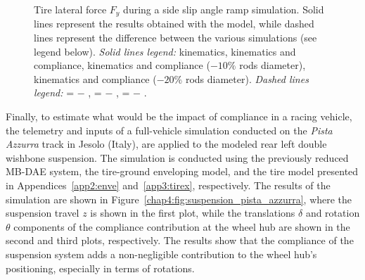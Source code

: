 \begin{figure}[!htp]
  \centering
  \small{}
  \caption{Tire lateral force $F_y$ during a side slip angle ramp simulation. Solid lines represent the results obtained with the \Simulink{} model, while dashed lines represent the difference between the various simulations (see legend below). \emph{Solid lines legend:}
  {\color{mycolor1}\raisebox{-.15pt}{$\blacksquare$}} kinematics, {\color{mycolor2}\raisebox{-.15pt}{$\blacksquare$}} kinematics and compliance, {\color{mycolor3}\raisebox{-.15pt}{$\blacksquare$}} kinematics and compliance ($-10\%$ rods diameter), {\color{mycolor5}\raisebox{-.15pt}{$\blacksquare$}} kinematics and compliance ($-20\%$ rods diameter).   \emph{Dashed lines legend:} {\color{mycolor1}\raisebox{-.15pt}{\scalebox{0.5}[1.0]{$\blacksquare$}}}{\color{mycolor2}\raisebox{-.15pt}{\scalebox{0.5}[1.0]{$\blacksquare$}}} = {\color{mycolor1}\raisebox{-.15pt}{$\blacksquare$}} $-$ {\color{mycolor2}\raisebox{-.15pt}{$\blacksquare$}}, {\color{mycolor1}\raisebox{-.15pt}{\scalebox{0.5}[1.0]{$\blacksquare$}}}{\color{mycolor3}\raisebox{-.15pt}{\scalebox{0.5}[1.0]{$\blacksquare$}}} = {\color{mycolor1}\raisebox{-.15pt}{$\blacksquare$}} $-$ {\color{mycolor3}\raisebox{-.15pt}{$\blacksquare$}},  {\color{mycolor1}\raisebox{-.15pt}{\scalebox{0.5}[1.0]{$\blacksquare$}}}{\color{mycolor5}\raisebox{-.15pt}{\scalebox{0.5}[1.0]{$\blacksquare$}}} = {\color{mycolor1}\raisebox{-.15pt}{$\blacksquare$}} $-$ {\color{mycolor5}\raisebox{-.15pt}{$\blacksquare$}}.
  }
  \label{chap4:fig:test_bench}
\end{figure}

Finally, to estimate what would be the impact of compliance in a racing vehicle, the telemetry and inputs of a full-vehicle simulation conducted on the \textit{Pista Azzurra} track in Jesolo (Italy), are applied to the modeled rear left double wishbone suspension. The simulation is conducted using the previously reduced \ac{MB}-\ac{DAE} system, the tire-ground enveloping model, and the tire model presented in Appendices~\ref{app2:enve} and~\ref{app3:tirex}, respectively. The results of the simulation are shown in Figure~\ref{chap4:fig:suspension_pista_azzurra}, where the suspension travel $z$ is shown in the first plot, while the translations $\delta$ and rotation $\theta$ components of the compliance contribution at the wheel hub are shown in the second and third plots, respectively. The results show that the compliance of the suspension system adds a non-negligible contribution to the wheel hub's positioning, especially in terms of rotations.

